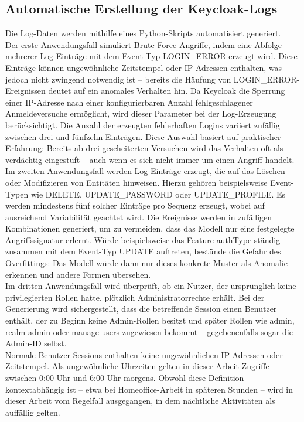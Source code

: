 \documentclass[a4paper,12pt]{article}
\begin{document}
	\subsection{Automatische Erstellung der Keycloak-Logs}
	Die Log-Daten werden mithilfe eines Python-Skripts automatisiert generiert.
	\\[0.5em]
	Der erste Anwendungsfall simuliert Brute-Force-Angriffe, indem eine Abfolge mehrerer Log-Einträge mit dem Event-Typ LOGIN\_ERROR erzeugt wird. Diese Einträge können ungewöhnliche Zeitstempel oder IP-Adressen enthalten, was jedoch nicht zwingend notwendig ist – bereits die Häufung von LOGIN\_ERROR-Ereignissen deutet auf ein anomales Verhalten hin. Da Keycloak die Sperrung einer IP-Adresse nach einer konfigurierbaren Anzahl fehlgeschlagener Anmeldeversuche ermöglicht, wird dieser Parameter bei der Log-Erzeugung berücksichtigt. Die Anzahl der erzeugten fehlerhaften Logins variiert zufällig zwischen drei und fünfzehn Einträgen. Diese Auswahl basiert auf praktischer Erfahrung: Bereits ab drei gescheiterten Versuchen wird das Verhalten oft als verdächtig eingestuft – auch wenn es sich nicht immer um einen Angriff handelt.
	\\[0.5em]
	Im zweiten Anwendungsfall werden Log-Einträge erzeugt, die auf das Löschen oder Modifizieren von Entitäten hinweisen. Hierzu gehören beispielsweise Event-Typen wie DELETE, UPDATE\_PASSWORD oder UPDATE\_PROFILE. Es werden mindestens fünf solcher Einträge pro Sequenz erzeugt, wobei auf ausreichend Variabilität geachtet wird. Die Ereignisse werden in zufälligen Kombinationen generiert, um zu vermeiden, dass das Modell nur eine festgelegte Angriffssignatur erlernt. Würde beispielsweise das Feature \gls{authType} ständig zusammen mit dem Event-Typ UPDATE auftreten, bestünde die Gefahr des Overfittings: Das Modell würde dann nur dieses konkrete Muster als Anomalie erkennen und andere Formen übersehen.
	\\[0.5em]
	Im dritten Anwendungsfall wird überprüft, ob ein Nutzer, der ursprünglich keine privilegierten Rollen hatte, plötzlich Administratorrechte erhält. Bei der Generierung wird sichergestellt, dass die betreffende Session einen Benutzer enthält, der zu Beginn keine Admin-Rollen besitzt und später Rollen wie admin, realm-admin oder manage-users zugewiesen bekommt – gegebenenfalls sogar die Admin-ID selbst.
	\\[0.5em]
	Normale Benutzer-Sessions enthalten keine ungewöhnlichen IP-Adressen oder Zeitstempel. Als ungewöhnliche Uhrzeiten gelten in dieser Arbeit Zugriffe zwischen 0:00 Uhr und 6:00 Uhr morgens. Obwohl diese Definition kontextabhängig ist – etwa bei Homeoffice-Arbeit in späteren Stunden – wird in dieser Arbeit vom Regelfall ausgegangen, in dem nächtliche Aktivitäten als auffällig gelten.
\end{document}
